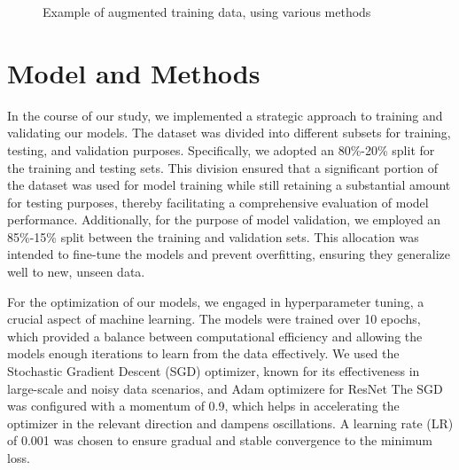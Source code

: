\begin{figure}%
	\centering
	\qquad
	\qquad

	\qquad
	\qquad
	\caption{
		Example of augmented training data, using various methods
	}%
	\label{preprocessing}
\end{figure}

\section{Model and Methods}

In the course of our study, we implemented a strategic approach to training and validating our models. The dataset was divided into different subsets for training, testing, and validation purposes. Specifically, we adopted an 80\%-20\% split for the training and testing sets. This division ensured that a significant portion of the dataset was used for model training while still retaining a substantial amount for testing purposes, thereby facilitating a comprehensive evaluation of model performance. Additionally, for the purpose of model validation, we employed an 85\%-15\% split between the training and validation sets. This allocation was intended to fine-tune the models and prevent overfitting, ensuring they generalize well to new, unseen data.

For the optimization of our models, we engaged in hyperparameter tuning, a crucial aspect of machine learning. The models were trained over 10 epochs, which provided a balance between computational efficiency and allowing the models enough iterations to learn from the data effectively. We used the Stochastic Gradient Descent (SGD) optimizer, known for its effectiveness in large-scale and noisy data scenarios, and Adam optimizere for ResNet The SGD was configured with a momentum of 0.9, which helps in accelerating the optimizer in the relevant direction and dampens oscillations. A learning rate (LR) of 0.001 was chosen to ensure gradual and stable convergence to the minimum loss.


